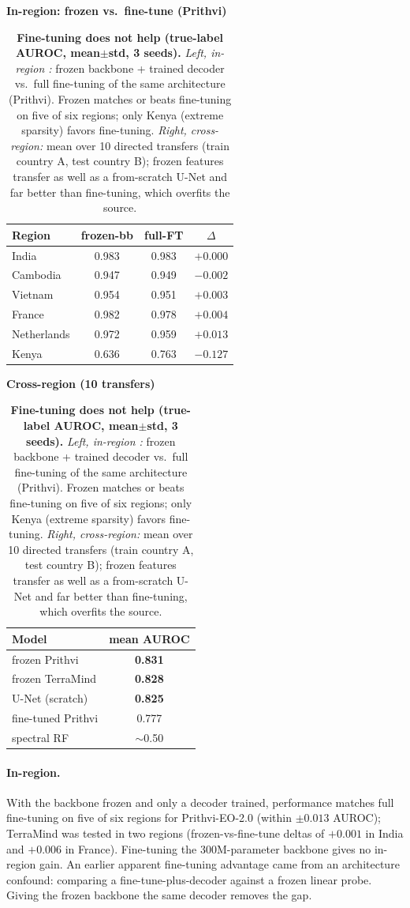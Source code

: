 \documentclass{article}
\begin{document}
\begin{table}[t]
\centering\small
\caption{\textbf{Fine-tuning does not help (true-label AUROC, mean$\pm$std, 3 seeds).}
\emph{Left, in-region :} frozen backbone + trained decoder vs.\
full fine-tuning of the same architecture (Prithvi). Frozen matches or beats
fine-tuning on five of six regions; only Kenya (extreme sparsity) favors fine-tuning.
\emph{Right, cross-region:} mean over 10 directed transfers (train country A, test
country B); frozen features transfer as well as a from-scratch U-Net and far better
than fine-tuning, which overfits the source.}
\label{tab:spine}
\begin{minipage}{0.56\linewidth}\centering
\textbf{In-region: frozen vs.\ fine-tune (Prithvi)}\\[2pt]
\begin{tabular}{lccc}
\toprule
Region & frozen-bb & full-FT & $\Delta$ \\
\midrule
India       & 0.983 & 0.983 & $+0.000$ \\
Cambodia    & 0.947 & 0.949 & $-0.002$ \\
Vietnam     & 0.954 & 0.951 & $+0.003$ \\
France      & 0.982 & 0.978 & $+0.004$ \\
Netherlands & 0.972 & 0.959 & $+0.013$ \\
Kenya       & 0.636 & 0.763 & $-0.127$ \\
\bottomrule
\end{tabular}
\end{minipage}\hfill
\begin{minipage}{0.4\linewidth}\centering
\textbf{Cross-region (10 transfers)}\\[2pt]
\begin{tabular}{lc}
\toprule
Model & mean AUROC \\
\midrule
frozen Prithvi  & \textbf{0.831} \\
frozen TerraMind & \textbf{0.828} \\
U-Net (scratch) & \textbf{0.825} \\
fine-tuned Prithvi & 0.777 \\
spectral RF & $\sim$0.50 \\
\bottomrule
\end{tabular}
\end{minipage}
\end{table}

\paragraph{In-region.} With the backbone frozen and only a decoder trained,
performance matches full fine-tuning on five of six regions for Prithvi-EO-2.0
(within $\pm0.013$ AUROC); TerraMind was tested in two regions (frozen-vs-fine-tune
deltas of $+0.001$ in India and $+0.006$ in France). Fine-tuning the 300M-parameter
backbone gives no in-region gain. An
earlier apparent fine-tuning advantage came from an architecture confound: comparing
a fine-tune-plus-decoder against a frozen linear probe. Giving the frozen backbone
the same decoder removes the gap.
\end{document}
